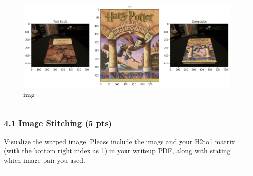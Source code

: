 \documentclass[11pt]{article}
\begin{document}
\begin{figure}
\centering
\includegraphics{results/q3_3.png}
\caption{img}
\end{figure}

\begin{center}\rule{0.5\linewidth}{0.5pt}\end{center}

    \hypertarget{image-stitching-5-pts}{%
\subsubsection{4.1 Image Stitching (5
pts)}\label{image-stitching-5-pts}}

Visualize the warped image. Please include the image and your H2to1
matrix (with the bottom right index as 1) in your writeup PDF, along
with stating which image pair you used.

    \begin{center}\rule{0.5\linewidth}{0.5pt}\end{center}
\end{document}
